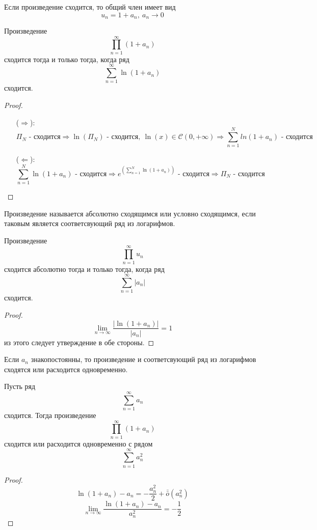 \begin{consequense}
    Если произведение сходится, то общий член имеет вид 
    \[u_n=1+a_n,\ a_n\to 0\]
\end{consequense}
\begin{theorem}
    Произведение 
    \[\prod\limits_{n=1}^{\infty}(1+a_n)\]
    сходится тогда и только тогда, когда ряд
    \[\sum\limits_{n=1}^{\infty}\ln{(1+a_n)}\]
    сходится.
\end{theorem}
\begin{proof}\tab
    \begin{itemize}
        \item[($\Rightarrow$):] 
        \[\Pi_{N}\text{ - сходится} \Rightarrow \ln(\Pi_N) \text{ - сходится},\ \ln(x)\in \mathcal{C}(0, +\infty) \Rightarrow \sum_{n=1}^N ln(1+a_n) \text{ - сходится}\]
        \item[($\Leftarrow$):]
        \[\sum_{n=1}^N \ln(1+a_n) \text{ - сходится} \Rightarrow e^{\left(\sum\limits_{n=1}^N \ln(1+a_n)\right)} \text{ - сходится} \Rightarrow \Pi_N \text{ - сходится}\]
    \end{itemize}
\end{proof}
\begin{definition}
    Произведение называется абсолютно сходящимся или условно сходящимся, если таковым является соответсвующий ряд из логарифмов. 
\end{definition}
\begin{theorem} Произведение
    \[\prod\limits_{n=1}^{\infty}u_n\]
    сходится абсолютно тогда и только тогда, когда ряд
    \[\sum\limits_{n=1}^{\infty}|a_n|\]
    сходится.
\end{theorem}
\begin{proof}
    \[\lim\limits_{n\to\infty}\frac{|\ln(1+a_n)|}{|a_n|}=1\]
    из этого следует утверждение в обе стороны.
\end{proof}
\begin{consequense}
    Если $a_n$ знакопостоянны, то произведение и соответсвующий ряд из логарифмов сходятся или расходится одновременно.
\end{consequense}
\begin{theorem}
    Пусть ряд
    \[\sum\limits_{n=1}^{\infty}a_n\]
    сходится. Тогда произведение 
    \[\prod\limits_{n=1}^{\infty}(1+a_n)\]
    сходится или расходится одновременно с рядом
    \[\sum\limits_{n=1}^{\infty}a_n^2\]
\end{theorem}
\begin{proof}
    \[\ln(1+a_n)-a_n=-\frac{a_n^2}{2}+\bar{\bar{o}}(a_n^2)\]
    \[\lim\limits_{n\to\infty}\frac{\ln(1+a_n)-a_n}{a_n^2}=-\frac{1}{2}\]
\end{proof}
